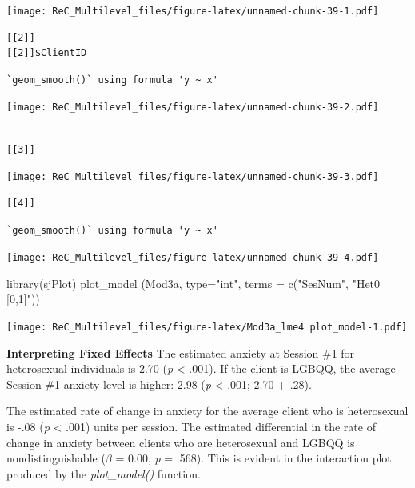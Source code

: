 \documentclass[
  english,
]{book}
\newenvironment{Shaded}{\begin{snugshade}}{\end{snugshade}}
\newcommand{\AttributeTok}[1]{\textcolor[rgb]{0.77,0.63,0.00}{#1}}
\newcommand{\FunctionTok}[1]{\textcolor[rgb]{0.00,0.00,0.00}{#1}}
\newcommand{\NormalTok}[1]{#1}
\newcommand{\StringTok}[1]{\textcolor[rgb]{0.31,0.60,0.02}{#1}}
\begin{document}
\texttt{[image: ReC\_Multilevel\_files/figure-latex/unnamed-chunk-39-1.pdf]}

\begin{verbatim}
[[2]]
[[2]]$ClientID
\end{verbatim}

\begin{verbatim}
`geom_smooth()` using formula 'y ~ x'
\end{verbatim}

\texttt{[image: ReC\_Multilevel\_files/figure-latex/unnamed-chunk-39-2.pdf]}

\begin{verbatim}

[[3]]
\end{verbatim}

\texttt{[image: ReC\_Multilevel\_files/figure-latex/unnamed-chunk-39-3.pdf]}

\begin{verbatim}
[[4]]
\end{verbatim}

\begin{verbatim}
`geom_smooth()` using formula 'y ~ x'
\end{verbatim}

\texttt{[image: ReC\_Multilevel\_files/figure-latex/unnamed-chunk-39-4.pdf]}

\begin{Shaded}
\begin{Highlighting}[]
\FunctionTok{library}\NormalTok{(sjPlot)}
\FunctionTok{plot\_model}\NormalTok{ (Mod3a, }\AttributeTok{type=}\StringTok{"int"}\NormalTok{, }\AttributeTok{terms =} \FunctionTok{c}\NormalTok{(}\StringTok{"SesNum"}\NormalTok{, }\StringTok{"Het0 [0,1]"}\NormalTok{))}
\end{Highlighting}
\end{Shaded}

\texttt{[image: ReC\_Multilevel\_files/figure-latex/Mod3a\_lme4 plot\_model-1.pdf]}

\textbf{Interpreting Fixed Effects}
The estimated anxiety at Session \#1 for heterosexual individuals is 2.70 (\emph{p} \textless{} .001). If the client is LGBQQ, the average Session \#1 anxiety level is higher: 2.98 (\emph{p} \textless{} .001; 2.70 + .28).

The estimated rate of change in anxiety for the average client who is heterosexual is -.08 (\emph{p} \textless{} .001) units per session. The estimated differential in the rate of change in anxiety between clients who are heterosexual and LGBQQ is nondistinguishable (\(\beta\) = 0.00, \emph{p} = .568). This is evident in the interaction plot produced by the \emph{plot\_model()} function.
\end{document}

